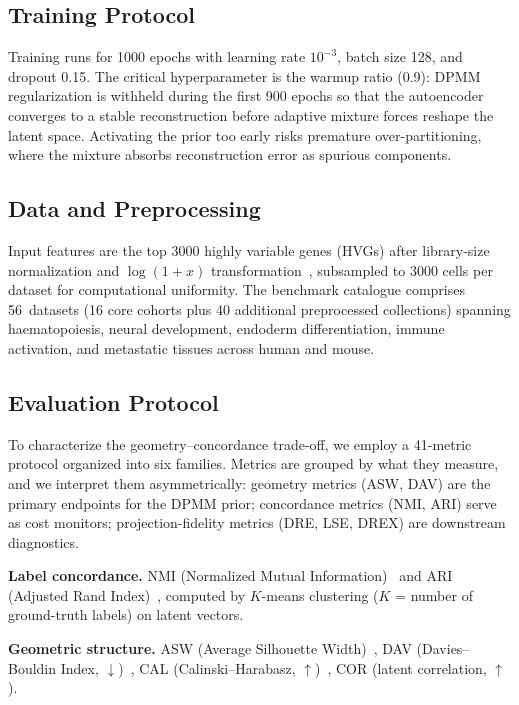\documentclass[biology,article,submit,pdftex,moreauthors]{Definitions/mdpi}
\begin{document}
\subsection{Training Protocol}
Training runs for 1000 epochs with learning rate $10^{-3}$, batch size 128, and dropout 0.15. The critical hyperparameter is the warmup ratio (0.9): DPMM regularization is withheld during the first 900 epochs so that the autoencoder converges to a stable reconstruction before adaptive mixture forces reshape the latent space. Activating the prior too early risks premature over-partitioning, where the mixture absorbs reconstruction error as spurious components.

\subsection{Data and Preprocessing}
Input features are the top 3000 highly variable genes (HVGs) after library-size normalization and $\log(1{+}x)$ transformation~\cite{wolf2018scanpy}, subsampled to 3000 cells per dataset for computational uniformity. The benchmark catalogue comprises 56~datasets (16 core cohorts plus 40 additional preprocessed collections) spanning haematopoiesis, neural development, endoderm differentiation, immune activation, and metastatic tissues across human and mouse.

\subsection{Evaluation Protocol}
To characterize the geometry--concordance trade-off, we employ a 41-metric protocol organized into six families. Metrics are grouped by what they measure, and we interpret them asymmetrically: geometry metrics (ASW, DAV) are the primary endpoints for the DPMM prior; concordance metrics (NMI, ARI) serve as cost monitors; projection-fidelity metrics (DRE, LSE, DREX) are downstream diagnostics.

\textbf{Label concordance.}
NMI (Normalized Mutual Information)~\cite{strehl2002cluster} and ARI (Adjusted Rand Index)~\cite{hubert1985comparing}, computed by $K$-means clustering ($K$ = number of ground-truth labels) on latent vectors.

\textbf{Geometric structure.}
ASW (Average Silhouette Width)~\cite{rousseeuw1987silhouettes}, DAV (Davies--Bouldin Index, $\downarrow$)~\cite{davies1979cluster}, CAL (Calinski--Harabasz, $\uparrow$)~\cite{calinski1974dendrite}, COR (latent correlation, $\uparrow$).
\end{document}
